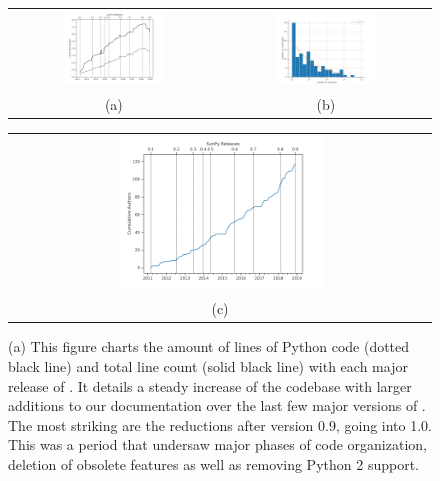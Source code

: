 \begin{figure}
\begin{tabular}{cc}
  \includegraphics[width=0.5\textwidth]{figures/sunpy_history.pdf} &
  \includegraphics[width=0.5\textwidth]{figures/busfactor_plot.pdf} \\
(a) & (b)  \\
\end{tabular}
\begin{tabular}{c}
  \includegraphics[width=0.5\textwidth]{figures/cumulative_authors.pdf} \\
(c)  \\
\end{tabular}
\caption{
	(a) This figure charts the amount of lines of Python code (dotted black line) and total line count (solid black line) with each major release of \sunpy.
	It details a steady increase of the \sunpypkg codebase with larger additions to our documentation over the last few major versions of \sunpypkg.
	The most striking are the reductions after version 0.9, going into 1.0.
	This was a period that undersaw major phases of code organization, deletion of obsolete features as well as removing Python 2 support.
}
\end{figure}
